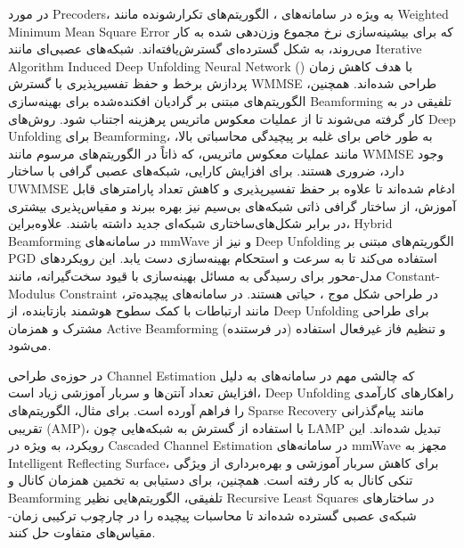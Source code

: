 در مورد 
\glspl{Precoder}،
 به ویژه در سامانه‌های 
،
 الگوریتم‌های تکرارشونده مانند 
\gls{Weighted Minimum Mean Square Error}
  که برای بیشینه‌سازی نرخ مجموع وزن‌دهی شده به کار می‌روند، به شکل گسترده‌ای گسترش‌یافته‌اند. شبکه‌های عصبی‌ای مانند 
\gls{Iterative Algorithm Induced Deep Unfolding Neural Network}
()
  با هدف کاهش زمان پردازش برخط و حفظ تفسیرپذیری با گسترش 
\gls{WMMSE}
   طراحی شده‌اند. همچنین، الگوریتم‌های مبتنی بر گرادیان افکنده‌شده برای بهینه‌سازی
\gls{Beamforming}
 تلفیقی در 
 به کار گرفته می‌شوند تا از عملیات معکوس ماتریس پرهزینه اجتناب شود.
 روش‌های 
\gls{Deep Unfolding}
 برای 
\gls{Beamforming}،
  به طور خاص برای غلبه بر پیچیدگی محاسباتی بالا، مانند عملیات معکوس ماتریس، که ذاتاً در الگوریتم‌های مرسوم مانند 
\gls{WMMSE}
   وجود دارد، ضروری هستند. برای افزایش کارایی، شبکه‌های عصبی گرافی با ساختار 
\gls{UWMMSE}
   ادغام شده‌اند تا علاوه بر حفظ تفسیرپذیری و کاهش تعداد پارامترهای قابل آموزش، از ساختار گرافی ذاتی شبکه‌های بی‌سیم نیز بهره ببرند و مقیاس‌پذیری بیشتری در برابر شکل‌های‌ساختاری شبکه‌ای جدید داشته باشند. علاوه‌براین، 
\gls{Hybrid Beamforming}
   در سامانه‌های 
\gls{mmWave} 
   و 
    نیز از 
\gls{Deep Unfolding}
    الگوریتم‌های مبتنی بر 
\gls{PGD}
     استفاده می‌کند تا به سرعت و استحکام بهینه‌سازی دست یابد. این رویکردهای مدل-محور برای رسیدگی به مسائل بهینه‌سازی با قیود سخت‌گیرانه، مانند 
\gls{Constant-Modulus Constraint}
      در طراحی شکل موج 
      ، حیاتی هستند. در سامانه‌های پیچیده‌تر، مانند ارتباطات با کمک سطوح هوشمند بازتابنده، از 
\gls{Deep Unfolding}
       برای طراحی مشترک و همزمان 
\gls{Active Beamforming}
        (در فرستنده) و تنظیم فاز غیرفعال استفاده می‌شود.

در حوزه‌ی طراحی 
\gls{Channel Estimation}
 که چالشی مهم در سامانه‌های 
 به دلیل افزایش تعداد آنتن‌ها و سربار آموزشی زیاد است، 
\gls{Deep Unfolding}
  راهکارهای کارآمدی را فراهم آورده است. برای مثال، الگوریتم‌های 
\gls{Sparse Recovery}
  مانند پیام‌گذرانی تقریبی 
(\gls{AMP})،
   با استفاده از گسترش به شبکه‌هایی چون 
\gls{LAMP}
    تبدیل شده‌اند. این رویکرد، به ویژه در 
\gls{Cascaded Channel Estimation}
 در سامانه‌های 
\gls{mmWave}
     مجهز به 
\gls{Intelligent Reflecting Surface}،
 برای کاهش سربار آموزشی و بهره‌برداری از ویژگی تنکی کانال به کار رفته است. همچنین، برای دستیابی به تخمین همزمان کانال و 
\gls{Beamforming}
تلفیقی، الگوریتم‌هایی نظیر
\gls{Recursive Least Squares}
 در ساختارهای شبکه‌ی عصبی گسترده شده‌اند تا محاسبات پیچیده را در چارچوب ترکیبی زمان-مقیاس‌های متفاوت حل کنند.

